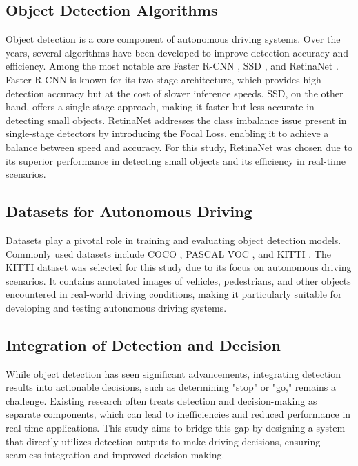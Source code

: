 \documentclass[10pt,twocolumn,letterpaper]{article}
\begin{document}
\subsection{Object Detection Algorithms}
Object detection is a core component of autonomous driving systems. Over the years, several algorithms have been developed to improve detection accuracy and efficiency. Among the most notable are Faster R-CNN \cite{fasterrcnn}, SSD \cite{ssd}, and RetinaNet \cite{retinanet}. Faster R-CNN is known for its two-stage architecture, which provides high detection accuracy but at the cost of slower inference speeds. SSD, on the other hand, offers a single-stage approach, making it faster but less accurate in detecting small objects. RetinaNet addresses the class imbalance issue present in single-stage detectors by introducing the Focal Loss, enabling it to achieve a balance between speed and accuracy. For this study, RetinaNet was chosen due to its superior performance in detecting small objects and its efficiency in real-time scenarios.

\subsection{Datasets for Autonomous Driving}
Datasets play a pivotal role in training and evaluating object detection models. Commonly used datasets include COCO \cite{coco}, PASCAL VOC \cite{pascalvoc}, and KITTI \cite{kitti}. The KITTI dataset was selected for this study due to its focus on autonomous driving scenarios. It contains annotated images of vehicles, pedestrians, and other objects encountered in real-world driving conditions, making it particularly suitable for developing and testing autonomous driving systems.

\subsection{Integration of Detection and Decision}
While object detection has seen significant advancements, integrating detection results into actionable decisions, such as determining "stop" or "go," remains a challenge. Existing research often treats detection and decision-making as separate components, which can lead to inefficiencies and reduced performance in real-time applications. This study aims to bridge this gap by designing a system that directly utilizes detection outputs to make driving decisions, ensuring seamless integration and improved decision-making.
\end{document}
